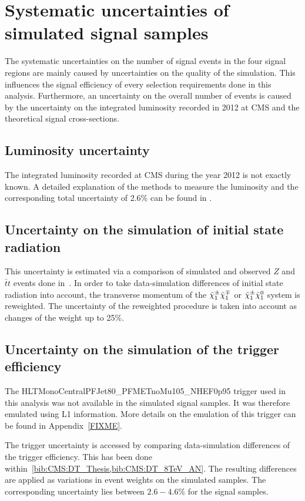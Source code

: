 \section{Systematic uncertainties of simulated signal samples}
The systematic uncertainties on the number of signal events in the four signal regions are mainly caused by uncertainties on the quality of the simulation.
This influences the signal efficiency of every selection requirements done in this analysis.
Furthermore, an uncertainty on the overall number of events is caused by the uncertainty on the integrated luminosity recorded in 2012 at CMS and the theoretical signal cross-sections.

\subsection*{Luminosity uncertainty}
The integrated luminosity recorded at CMS during the year 2012 is not exactly known. 
A detailed explanation of the methods to measure the luminosity and the corresponding total uncertainty of 2.6\% can be found in \cite{bib:CMS:Lumi_PAS}.

\subsection*{Uncertainty on the simulation of initial state radiation}
This uncertainty is estimated via a comparison of simulated and observed $Z$ and $\bar{t}t$ events done in~\cite{bib:CMS:ISR_AN}.
In order to take data-simulation differences of initial state radiation into account, the transverse momentum of the $\tilde{\chi}^{\pm}_{1}\tilde{\chi}^{\mp}_{1}$ or $\tilde{\chi}^{\pm}_{1}\tilde{\chi}^{0}_{1}$ system is reweighted.
The uncertainty of the reweighted procedure is taken into account as changes of the weight up to 25\%.

\subsection*{Uncertainty on the simulation of the trigger efficiency}
The HLTMonoCentralPFJet80\_PFMETnoMu105\_NHEF0p95 trigger used in this analysis was not available in the simulated signal samples.
It was therefore emulated using L1 information. More details on the emulation of this trigger can be found in Appendix~\ref{FIXME}.

The trigger uncertainty is accessed by comparing data-simulation differences of the trigger efficiency.
This has been done within~\ref{bib:CMS:DT_Thesis,bib:CMS:DT_8TeV_AN}.
The resulting differences are applied as variations in event weights on the simulated samples.
The corresponding uncertainty lies between $2.6-4.6\%$ for the signal samples.

